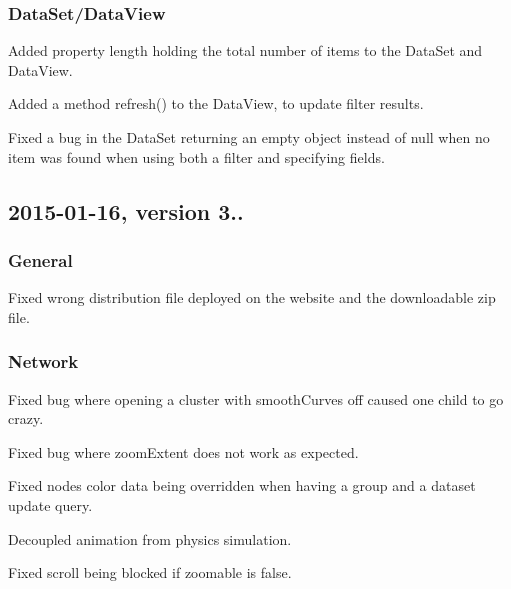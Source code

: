 \subsubsection*{Data\+Set/\+Data\+View}


\begin{DoxyItemize}
\item Added property {\ttfamily length} holding the total number of items to the {\ttfamily Data\+Set} and {\ttfamily Data\+View}.
\item Added a method {\ttfamily refresh()} to the {\ttfamily Data\+View}, to update filter results.
\item Fixed a bug in the {\ttfamily Data\+Set} returning an empty object instead of {\ttfamily null} when no item was found when using both a filter and specifying fields.
\end{DoxyItemize}

\subsection*{2015-\/01-\/16, version 3..}

\subsubsection*{General}


\begin{DoxyItemize}
\item Fixed wrong distribution file deployed on the website and the downloadable zip file.
\end{DoxyItemize}

\subsubsection*{Network}


\begin{DoxyItemize}
\item Fixed bug where opening a cluster with smooth\+Curves off caused one child to go crazy.
\item Fixed bug where zoom\+Extent does not work as expected.
\item Fixed nodes color data being overridden when having a group and a dataset update query.
\item Decoupled animation from physics simulation.
\item Fixed scroll being blocked if zoomable is false.
\end{DoxyItemize}


